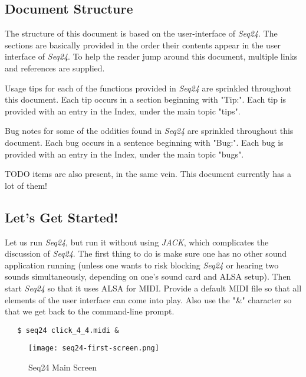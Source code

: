\documentclass[
 11pt,
 twoside,
 a4paper,
 headinclude,
 footinclude,
 final                                 %
]{article}
\begin{document}
\subsection{Document Structure}
\label{subsec:introduction_document_structure}

   The structure of this document is based on the user-interface of
   \textsl{Seq24}.
   The sections are basically provided
   in the order their contents appear in the user interface of
   \textsl{Seq24}.  To help the reader jump around this document, multiple
   links and references are supplied.

   Usage tips
   for each of the functions provided in
   \textsl{Seq24} are sprinkled throughout this document.
   Each tip occurs in a section beginning with "Tip:".
   Each tip is provided with an entry in the Index, under the
   main topic "tips".

   Bug notes
   for some of the oddities found in \textsl{Seq24} are
   sprinkled throughout this document.
   Each bug occurs in a sentence beginning with "Bug:".
   Each bug is provided with an entry in the Index, under the
   main topic "bugs".

   TODO items
   are also present, in the same vein.
   This document currently has a lot of them!

\subsection{Let's Get Started!}
\label{subsec:introduction_lets_get_started}

   Let us run \textsl{Seq24}, but run it without using \textsl{JACK}, which
   complicates the discussion of \textsl{Seq24}.  The first
   thing to do is make sure one has no other sound application running
   (unless one wants to risk blocking \textsl{Seq24} or hearing two sounds
   simultaneously, depending on one's sound card and ALSA setup).
   Then start \textsl{Seq24} so that it uses ALSA for
   MIDI.  Provide a default MIDI file so that all elements of the user
   interface can come into play.
   Also use the "\&" character so that we get back to the
   command-line prompt.

\begin{verbatim}
   $ seq24 click_4_4.midi &
\end{verbatim}

\begin{figure}[H]
   \centering 
   \texttt{[image: seq24-first-screen.png]}
   \caption{Seq24 Main Screen}
   \label{fig:seq24_main_screen}
\end{figure}
\end{document}
